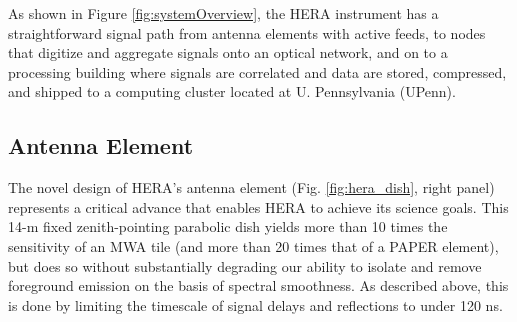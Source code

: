 \documentclass[ars]{/Users/daviddeboer1/Documents/Papers/Copernicus_LaTeX_Package_v_2_7/copernicus}
\def\nwnh{{\sl NWNH}}
\begin{document}
%
%
%


As shown in Figure \ref{fig:systemOverview}, the HERA instrument has a straightforward signal
path from antenna elements
with active feeds, to nodes that digitize and aggregate signals onto an optical network,
and on to a processing building where signals are correlated and data are stored, compressed,
and shipped to a computing cluster located at U. Pennsylvania (UPenn). 

\subsection{Antenna Element}

The novel design of HERA's antenna element
(Fig. \ref{fig:hera_dish}, right panel) represents a critical advance
that enables HERA to achieve its science goals.  This 14-m
fixed zenith-pointing parabolic dish yields more than 10 times the
sensitivity of an MWA tile (and more than 20 times
that of a PAPER element), but does so without substantially degrading
our ability to isolate and remove foreground emission on the basis of
spectral smoothness.  As described above, this is done by limiting
the timescale of signal delays and reflections to under 120 ns.
\end{document}
